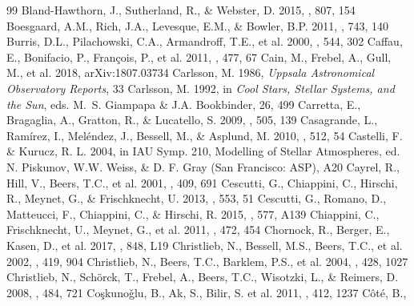 \documentclass[preprint]{aastex61}
\begin{document}
{\begin{thebibliography}{99}
  Bland-Hawthorn, J., Sutherland, R., \& Webster, D. 2015, \apj, 807,
  154
 Boesgaard, A.M.,
  Rich, J.A., Levesque, E.M., \& Bowler, B.P. 2011, \apj, 743, 140
 Burris, D.L., Pilachowski,
C.A., Armandroff, T.E., et al. 2000, \apj, 544, 302
 Caffau, E., Bonifacio, P.,
  Fran\c{c}ois, P., et al. 2011, \nat, 477, 67
 Cain, M., Frebel, A., Gull, M.,
  et al. 2018, arXiv:1807.03734
 Carlsson, M. 1986, {\it
  Uppsala Astronomical Observatory Reports}, 33
 Carlsson, M. 1992, in {\it
  Cool Stars, Stellar Systems, and the Sun}, eds. M.~S. Giampapa \&
  J.A. Bookbinder, 26, 499
 Carretta, E.,
Bragaglia, A., Gratton, R., \& Lucatello, S. 2009, \aap, 505, 139
 Casagrande, L.,
  Ram\'{i}rez, I., Mel\'{e}ndez, J., Bessell, M., \& Asplund, M. 2010,
  \aap, 512, 54
 Castelli, F. \&
Kurucz, R. L. 2004, in IAU Symp. 210, Modelling of Stellar
Atmospheres, ed. N. Piskunov, W.W. Weiss, \& D. F. Gray (San
Francisco: ASP), A20
 Cayrel, R., Hill, V.,
  Beers, T.C., et al. 2001, \nat, 409, 691
 Cescutti, G.,
  Chiappini, C., Hirschi, R., Meynet, G., \& Frischknecht, U. 2013,
  \aap, 553, 51
 Cescutti, G., Romano,
  D., Matteucci, F., Chiappini, C., \& Hirschi, R. 2015, \aap, 577,
  A139 
 Chiappini, C.,
  Frischknecht, U., Meynet, G., et al. 2011, \nat, 472, 454
 Chornock, R., Berger,
  E., Kasen, D., et al. 2017, \apj, 848, L19
 Christlieb, N.,
  Bessell, M.S., Beers, T.C., et al. 2002, \nat, 419, 904
 Christlieb, N.,
  Beers, T.C., Barklem, P.S., et al. 2004, \aap, 428, 1027
 Christlieb, N.,
  Sch\"{o}rck, T., Frebel, A., Beers, T.C., Wisotzki, L., \& Reimers,
  D. 2008, \aap, 484, 721
 Co{\c
  s}kuno{\v g}lu, B., Ak, S., Bilir, S. et al. 2011, \mnras, 412, 1237
 C\^{o}t\'{e}, B.,

\end{thebibliography}}
\end{document}
